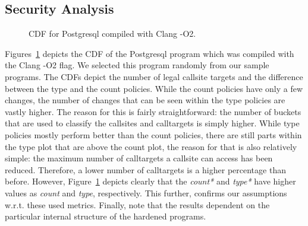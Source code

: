 \subsection{Security Analysis}
\label{RQ5: Security Analysis}

\begin{figure}[h] 
\hspace{-.3cm}
  \begin{minipage}[b]{1.0\linewidth}
    \centering
    \resizebox{1.04\columnwidth}{!}{}
    \caption{CDF for Postgresql compiled with Clang -O2.} 
    \label{fig7} 
    \vspace{1ex}
  \end{minipage}%
\end{figure}
Figures~\ref{fig7}
depicts the CDF of the Postgresql program which was compiled with the Clang -O2 flag. 
We selected this program randomly from our sample programs. 
The CDFs depict the number of legal callsite targets and the difference between the type and the count policies. 
While the count  policies have only a few changes, the number of changes that can be seen within the 
type policies are vastly higher. The reason for this is fairly straightforward: the number of buckets 
that are used to classify the callsites and calltargets is simply higher. While type policies mostly 
perform better than the count policies, there are still parts within the type plot that are above the 
count plot, the reason for that is also relatively simple: the maximum number of calltargets a 
callsite can access has been reduced. Therefore, a lower number of calltargets is a higher 
percentage than before. However, Figure~\ref{fig7} depicts clearly
that the \textit{count*} and \textit{type*} have higher values as 
\textit{count} and \textit{type}, respectively. This further, confirms our assumptions 
w.r.t. these used metrics. Finally, note that the results dependent on the particular 
internal structure of the hardened programs.


